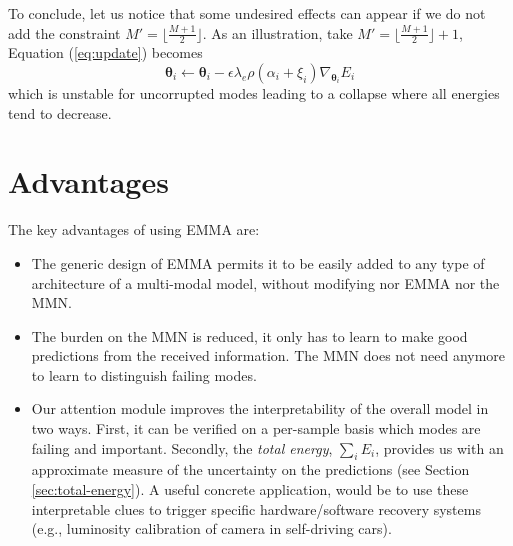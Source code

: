 To conclude, let us notice that some undesired effects can appear if we do not add the constraint $M' = \lfloor \frac{M+1}{2} \rfloor$. As an illustration, take $M' = \lfloor \frac{M+1}{2} \rfloor + 1$, Equation (\ref{eq:update}) becomes
\begin{equation}
\bm{\theta}_i \leftarrow \bm{\theta}_i - \epsilon\lambda_e\rho(\alpha_i + \xi_i)\nabla_{\bm{\theta}_i}E_i
\end{equation}
which is unstable for uncorrupted modes leading to a collapse where all energies tend to decrease.


\section{Advantages}
The key advantages of using EMMA are:
\begin{itemize}
\item The generic design of EMMA permits it to be easily added to any type of architecture of a multi-modal model, without modifying nor EMMA nor the MMN.
\item The burden on the MMN is reduced, it only has to learn to make good predictions from the received information. The MMN does not need anymore to learn to distinguish failing modes.
\item Our attention module improves the interpretability of the overall model in two ways. First, it can be verified on a per-sample basis which modes are failing and important. Secondly, the \textit{total energy}, $\sum_i E_i$, provides us with an approximate measure of the uncertainty on the predictions (see Section \ref{sec:total-energy}). A useful concrete application, would be to use these interpretable clues to trigger specific hardware/software recovery systems (e.g., luminosity calibration of camera in self-driving cars).
\end{itemize}

